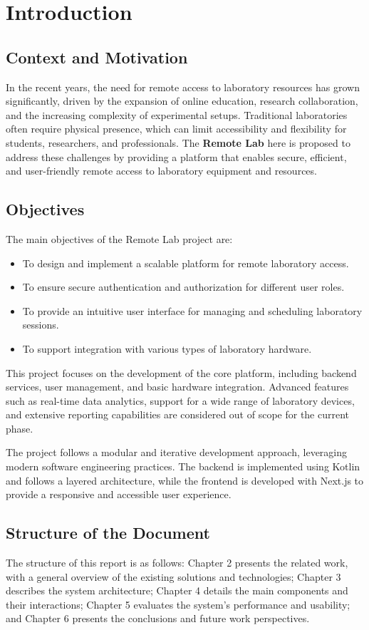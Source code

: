%
%
\chapter{Introduction} \label{cap:intro}

%
%
\section{Context and Motivation} \label{sec11}
In the recent years, the need for remote access to laboratory resources has grown significantly, driven by the expansion of online education, research collaboration, and the increasing complexity of experimental setups. Traditional laboratories often require physical presence, which can limit accessibility and flexibility for students, researchers, and professionals.
The \textbf{Remote Lab} here is proposed to address these challenges by providing a platform that enables secure, efficient, and user-friendly remote access to laboratory equipment and resources.

%
%
\section{Objectives} \label{sec12}
The main objectives of the Remote Lab project are:
\begin{itemize}
    \item To design and implement a scalable platform for remote laboratory access.
    \item To ensure secure authentication and authorization for different user roles.
    \item To provide an intuitive user interface for managing and scheduling laboratory sessions.
    \item To support integration with various types of laboratory hardware.
\end{itemize}

This project focuses on the development of the core platform, including backend services, user management, and basic hardware integration. Advanced features such as real-time data analytics, support for a wide range of laboratory devices, and extensive reporting capabilities are considered out of scope for the current phase.

The project follows a modular and iterative development approach, leveraging modern software engineering practices. The backend is implemented using Kotlin and follows a layered architecture, while the frontend is developed with Next.js to provide a responsive and accessible user experience.

%
%
\section{Structure of the Document} \label{sec13}
The structure of this report is as follows: Chapter 2 presents the related work, with a general overview of the existing solutions and technologies; Chapter 3 describes the system architecture; Chapter 4 details the main components and their interactions; Chapter 5 evaluates the system's performance and usability; and Chapter 6 presents the conclusions and future work perspectives.